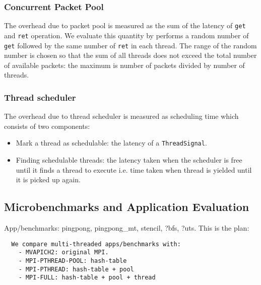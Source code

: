 \subsubsection{Concurrent Packet Pool}
The overhead due to packet pool is measured as the sum of the latency of
\texttt{get} and \texttt{ret} operation. We evaluate this quantity by performs
a random number of \texttt{get} followed by the same number of \texttt{ret} in
each thread. The range of the random number is chosen so that the sum of all
threads does not exceed the total number of available packets: the maximum is
number of packets divided by number of threads.

\subsubsection{Thread scheduler}
The overhead due to thread scheduler is measured as scheduling time which consists
of two components:
\begin{itemize}
    \item Mark a thread as schedulable: the latency of a \texttt{ThreadSignal}.
    \item Finding schedulable threads: the latency taken when the scheduler is free
      until it finds a thread to execute i.e. time taken when thread is yielded until
      it is picked up again.
\end{itemize}

\subsection{Microbenchmarks and Application Evaluation}
App/benchmarks: pingpong, pingpong_mt, stencil, ?bfs, ?uts.
This is the plan:
  \begin{verbatim}
  We compare multi-threaded apps/benchmarks with:
    - MVAPICH2: original MPI.
    - MPI-PTHREAD-POOL: hash-table
    - MPI-PTHREAD: hash-table + pool
    - MPI-FULL: hash-table + pool + thread
  \end{verbatim}
